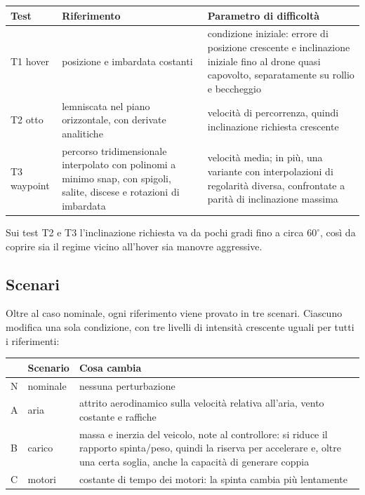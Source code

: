 \documentclass[11pt,a4paper]{article}
\begin{document}
\begin{center}
\begin{tabularx}{\textwidth}{@{}l L L@{}}
\toprule
Test & Riferimento & Parametro di difficoltà \\
\midrule
T1 hover & posizione e imbardata costanti & condizione iniziale: errore di posizione crescente e inclinazione iniziale fino al drone quasi capovolto, separatamente su rollio e beccheggio \\ \addlinespace
T2 otto & lemniscata nel piano orizzontale, con derivate analitiche & velocità di percorrenza, quindi inclinazione richiesta crescente \\ \addlinespace
T3 waypoint & percorso tridimensionale interpolato con polinomi a minimo snap, con spigoli, salite, discese e rotazioni di imbardata & velocità media; in più, una variante con interpolazioni di regolarità diversa, confrontate a parità di inclinazione massima \\
\bottomrule
\end{tabularx}
\end{center}

Sui test T2 e T3 l'inclinazione richiesta va da pochi gradi fino a circa \(60^\circ\), così da coprire sia il regime vicino all'hover sia manovre aggressive.

\subsection{Scenari}

Oltre al caso nominale, ogni riferimento viene provato in tre scenari. Ciascuno modifica una sola condizione, con tre livelli di intensità crescente uguali per tutti i riferimenti:

\begin{center}
\begin{tabularx}{\textwidth}{@{}l l L@{}}
\toprule
 & Scenario & Cosa cambia \\
\midrule
N & nominale & nessuna perturbazione \\ \addlinespace
A & aria & attrito aerodinamico sulla velocità relativa all'aria, vento costante e raffiche \\ \addlinespace
B & carico & massa e inerzia del veicolo, note al controllore: si riduce il rapporto spinta/peso, quindi la riserva per accelerare e, oltre una certa soglia, anche la capacità di generare coppia \\ \addlinespace
C & motori & costante di tempo dei motori: la spinta cambia più lentamente \\
\bottomrule
\end{tabularx}
\end{center}
\end{document}
